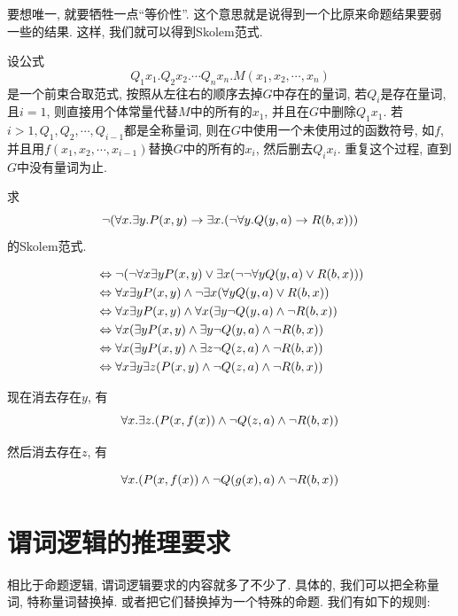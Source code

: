 要想唯一, 就要牺牲一点``等价性''. 这个意思就是说得到一个比原来命题结果要弱一些的结果. 这样, 我们就可以得到Skolem范式. 

\begin{definition}
	设公式$$Q_1x_1. Q_2x_2. \cdots Q_nx_n. M(x_1,x_2,\cdots,x_n)$$是一个前束合取范式, 按照从左往右的顺序去掉$G$中存在的量词, 若$Q_i$是存在量词, 且$i=1$, 则直接用个体常量代替$M$中的所有的$x_1$, 并且在$G$中删除$Q_1x_1$. 若$i>1,Q_1,Q_2,\cdots,Q_{i-1}$都是全称量词, 则在$G$中使用一个未使用过的函数符号, 如$f$, 并且用$f(x_1,x_2,\cdots, x_{i-1})$替换$G$中的所有的$x_i$, 然后删去$Q_ix_i$. 重复这个过程, 直到$G$中没有量词为止.
\end{definition}

\begin{example}
	求
	$$
	\lnot (\forall x. \exists y. P(x,y)\to \exists x. (\lnot \forall y. Q(y,a)\to R(b,x)))
	$$
	的Skolem范式. 
\end{example}

\begin{sol}
	\begin{align*}
& \Leftrightarrow\neg(\neg \forall x \exists y P(x, y) \vee \exists x(\neg \neg \forall y Q(y, a) \vee R(b, x))) \\
&  \Leftrightarrow\forall x \exists y P(x, y) \wedge \neg \exists x(\forall y Q(y, a) \vee R(b, x)) \\
&  \Leftrightarrow\forall x \exists y P(x, y) \wedge \forall x(\exists y \neg Q(y, a) \wedge \neg R(b, x)) \\
&  \Leftrightarrow\forall x(\exists y P(x, y) \wedge \exists y \neg Q(y, a) \wedge \neg R(b, x)) \\
&  \Leftrightarrow\forall x(\exists y P(x, y) \wedge \exists z \neg Q(z, a) \wedge \neg R(b, x)) \\
&  \Leftrightarrow\forall x \exists y \exists z(P(x, y) \wedge \neg Q(z, a) \wedge \neg R(b, x))
\end{align*}

现在消去存在$y$, 有
$$
\forall x. \exists z. (P(x,f(x))\land\lnot Q(z,a)\land\lnot R(b,x))
$$

然后消去存在$z$, 有

$$
\forall x. (P(x,f(x))\land\lnot Q(g(x),a)\land\lnot R(b,x))
$$

\end{sol}

\section{谓词逻辑的推理要求}

相比于命题逻辑, 谓词逻辑要求的内容就多了不少了. 具体的, 我们可以把全称量词, 特称量词替换掉. 或者把它们替换掉为一个特殊的命题. 我们有如下的规则: 

